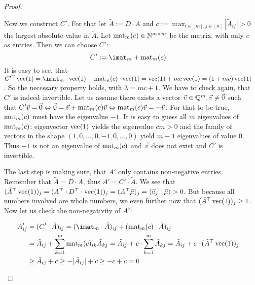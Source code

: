 \begin{proof}
\begin{enumerate}
        Now we construct $C'$. For that let $\tilde A := D \cdot A$ and $c := \max_{i \in [m], j\in[n]} |\tilde A_{ij}| > 0$ the largest absolute value in $\tilde A$. Let $\operatorname{mat}_m(c) \in \mathbb{N}^{m\times m}$ be the matrix, with only $c$ as entries. Then we can choose $C'$:
        $$C' := \imat_m + \opmat_m(c)$$
        It is easy to see, that $C'^\top \opvec(1) = \imat_m\cdot \opvec(1) + \opmat_m(c)\cdot \opvec(1) = \opvec(1) + mc \opvec(1) = (1 + mc)\opvec(1)$. So the necessary property holds, with $\lambda = mc+1$. We have to check again, that $C'$ is indeed invertible. Let us assume there exists a vector $\vec v \in \mathbb{Q}^m, \vec v \neq \vec0$ such that $C'\vec v = \vec 0 \Leftrightarrow \vec0 = \vec v + \operatorname{mat}_m(c)\vec v \Leftrightarrow \operatorname{mat}_m(c)\vec v = -\vec v$. For that to be true, $\operatorname{mat}_m(c)$ must have the eigenvalue $-1$. It is easy to guess all $m$ eigenvalues of $\operatorname{mat}_m(c)$: eigenvector $\operatorname{vec}(1)$ yields the eigenvalue $cm>0$ and the family of vectors in the shape $(1, 0, \dots, 0, -1, 0, \dots, 0)$ yield $m-1$ eigenvalues of value $0$. Thus $-1$ is not an eigenvalue of $\operatorname{mat}_m(c)$ and $\vec v$ does not exist and $C'$ is invertible.

        The last step is making sure, that $A'$ only contains non-negative entries. Remember that $\tilde A = D \cdot A$, thus $A' = C' \cdot \tilde A$. We see that $(\tilde A^\top \operatorname{vec}(1))_j =(A^\top\cdot D^\top\cdot \operatorname{vec}(1))_j = (A^\top \vec\mu)_j = \langle \vec a_j \mid \vec\mu \rangle > 0$. But because all numbers involved are whole numbers, we even further now that $(\tilde A^\top \operatorname{vec}(1))_j \geq 1$. Now let us check the non-negativity of $A'$:

        \begin{align*}
            A'_{ij} &= (C'\cdot \tilde A)_{ij} = (\imat_m \cdot \tilde A)_{ij} + (\opmat_m(c)\cdot \tilde A)_{ij}\\
            &= \tilde A_{ij} + \sum_{k=1}^{m}\opmat_m(c)_{ik} \tilde A_{kj} = \tilde A_{ij} + c \cdot \sum_{k=1}^{m} \tilde A_{kj} = \tilde A_{ij} + c \cdot (\tilde A^\top \opvec(1))_j\\
            &\geq \tilde A_{ij} + c \geq - |\tilde A_{ij}| + c \geq - c + c = 0
        \end{align*}
        

\end{enumerate}
\end{proof}
